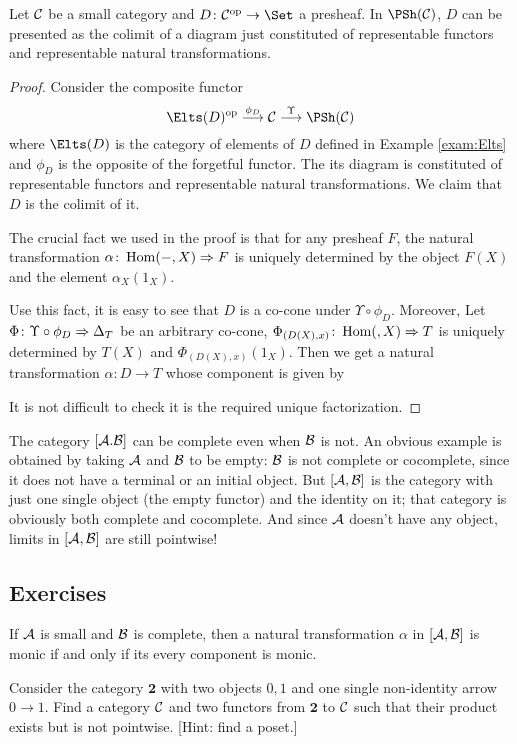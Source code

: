   \begin{thm}
    Let ${\cal C}$ be a small category and $D\colon\Cc^{\op}\to\Set$ a presheaf. In $\PSh(\Cc)$, $D$ can be presented as the colimit of a diagram just constituted of representable functors and representable natural transformations.
  \end{thm}
  \begin{proof}
    Consider the composite functor
    \begin{equation*}
      \Elts(D)^{\op}\markar{\phi_D}\Cc\markar{\Upsilon}\PSh(\Cc)
    \end{equation*}
    where $\Elts(D)$ is the category of elements of $D$ defined in Example \ref{exam:Elts} and $\phi_D$ is the opposite of the forgetful functor.
    The its diagram is constituted of representable functors and representable natural transformations. We claim that $D$ is the colimit of it.

    The crucial fact we used in the proof is that for any presheaf $F$, the natural transformation $\alpha\colon\operatorname{Hom}(-,X)\Rightarrow F$ is uniquely determined by the object $F(X)$ and the element $\alpha_X(1_X)$.

    Use this fact, it is easy to see that $D$ is a co-cone under $\Upsilon\circ\phi_D$. Moreover, Let $\Phi\colon\Upsilon\circ\phi_D \Rightarrow \Delta_T$ be an arbitrary co-cone, $\Phi_{(D(X),x)}\colon\operatorname{Hom}(,X)\Rightarrow T$ is uniquely determined by $T(X)$ and $\Phi_{(D(X),x)}(1_X)$. Then we get a natural transformation $\alpha\colon D\to T$ whose component is given by

    It is not difficult to check it is the required unique factorization.
  \end{proof}

  \begin{exam}
    The category $[{\cal A}.{\cal B}]$ can be complete even when ${\cal B}$ is not. An obvious example is obtained by taking ${\cal A}$ and ${\cal B}$ to be empty: ${\cal B}$ is not complete or cocomplete, since it does not have a terminal or an initial object. But $[{\cal A},{\cal B}]$ is the category with just one single object (the empty functor) and the identity on it; that category is obviously both complete and cocomplete. And since ${\cal A}$ doesn't have any object, limits in $[{\cal A},{\cal B}]$ are still pointwise! %
  \end{exam}

\subsection{Exercises}
  \begin{ex}
    If ${\cal A}$ is small and ${\cal B}$ is complete, then a natural transformation $\alpha$ in $[{\cal A},{\cal B}]$ is monic if and only if its every component is monic.
  \end{ex}
  \begin{ex}
    Consider the category $\mathbf{2}$ with two objects $0,1$ and one single non-identity arrow $0\to1$. Find a category ${\cal C}$ and two functors from $\mathbf{2}$ to ${\cal C}$ such that their product exists but is not pointwise. [Hint: find a poset.]
  \end{ex}


